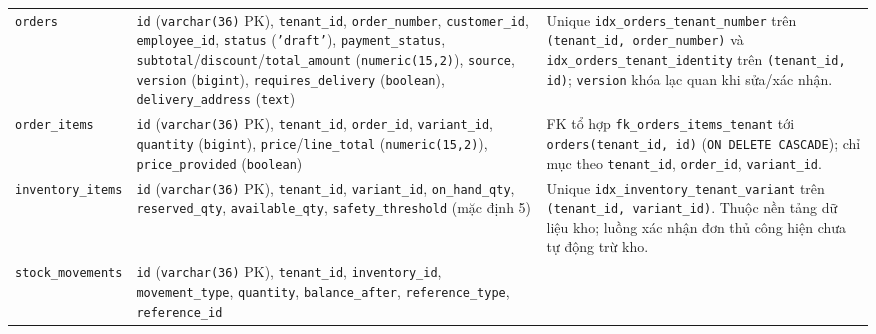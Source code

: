 \begin{table}[htbp]
\begin{tabularx}{\linewidth}{@{}
    >{\raggedright\arraybackslash}p{3.1cm}
    >{\raggedright\arraybackslash}p{5.5cm}
    >{\raggedright\arraybackslash}X@{}}
    \texttt{orders} &
    \texttt{id} (\texttt{varchar(36)} PK), \texttt{tenant\_id}, \texttt{order\_number}, \texttt{customer\_id}, \texttt{employee\_id}, \texttt{status} (\texttt{'draft'}), \texttt{payment\_status}, \texttt{subtotal}/\hspace{0pt}\texttt{discount}/\hspace{0pt}\texttt{total\_amount} (\texttt{numeric(15,2)}), \texttt{source}, \texttt{version} (\texttt{bigint}), \texttt{requires\_delivery} (\texttt{boolean}), \texttt{delivery\_address} (\texttt{text}) &
    Unique \texttt{idx\_\hspace{0pt}orders\_\hspace{0pt}tenant\_\hspace{0pt}number} trên \texttt{(tenant\_id, order\_number)} và \texttt{idx\_\hspace{0pt}orders\_\hspace{0pt}tenant\_\hspace{0pt}identity} trên \texttt{(tenant\_id, id)}; \texttt{version} khóa lạc quan khi sửa/xác nhận. \\
    \texttt{order\_items} &
    \texttt{id} (\texttt{varchar(36)} PK), \texttt{tenant\_id}, \texttt{order\_id}, \texttt{variant\_id}, \texttt{quantity} (\texttt{bigint}), \texttt{price}/\hspace{0pt}\texttt{line\_total} (\texttt{numeric(15,2)}), \texttt{price\_provided} (\texttt{boolean}) &
    FK tổ hợp \texttt{fk\_\hspace{0pt}orders\_\hspace{0pt}items\_\hspace{0pt}tenant} tới \texttt{orders(tenant\_id, id)} (\texttt{ON DELETE CASCADE}); chỉ mục theo \texttt{tenant\_id}, \texttt{order\_id}, \texttt{variant\_id}. \\
    \texttt{inventory\_\hspace{0pt}items} &
    \texttt{id} (\texttt{varchar(36)} PK), \texttt{tenant\_id}, \texttt{variant\_id}, \texttt{on\_hand\_qty}, \texttt{reserved\_qty}, \texttt{available\_qty}, \texttt{safety\_threshold} (mặc định 5) &
    Unique \texttt{idx\_\hspace{0pt}inventory\_\hspace{0pt}tenant\_\hspace{0pt}variant} trên \texttt{(tenant\_id, variant\_id)}. Thuộc nền tảng dữ liệu kho; luồng xác nhận đơn thủ công hiện chưa tự động trừ kho. \\
    \texttt{stock\_\hspace{0pt}movements} &
    \texttt{id} (\texttt{varchar(36)} PK), \texttt{tenant\_id}, \texttt{inventory\_id}, \texttt{movement\_type}, \texttt{quantity}, \texttt{balance\_after}, \texttt{reference\_type}, \texttt{reference\_id} &

\end{tabularx}
\end{table}
